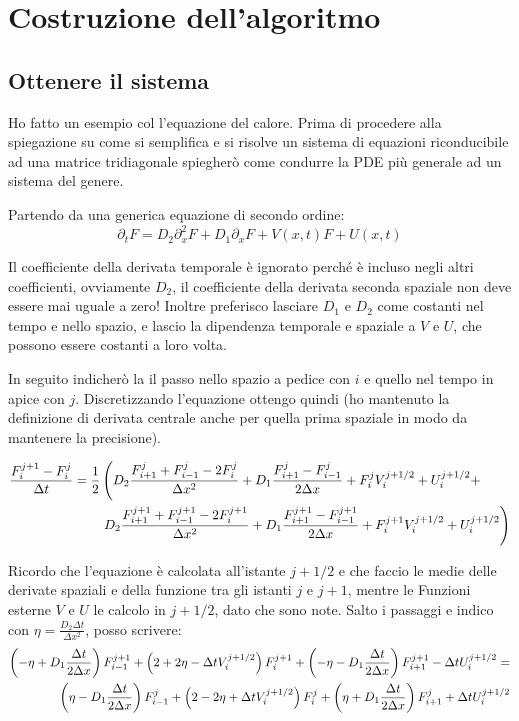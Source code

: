\section{Costruzione dell'algoritmo}
\subsection{Ottenere il sistema}
Ho fatto un esempio col l'equazione del calore. Prima di procedere alla spiegazione su come si semplifica e si risolve un sistema di equazioni riconducibile ad una matrice tridiagonale spiegher\`o come condurre la PDE pi\`u generale ad un sistema del genere.

Partendo da una generica equazione di secondo ordine:
\begin{equation}\label{eq:generica}
\partial_t F = D_2 \partial^2_x F + D_1 \partial_x F + V(x,t) F + U(x,t)
\end{equation}

Il coefficiente della derivata temporale \`e ignorato perch\'e \`e incluso negli altri coefficienti, ovviamente $D_2$, il coefficiente della derivata seconda spaziale non deve essere mai uguale a zero!
Inoltre preferisco lasciare $D_1$ e $D_2$ come costanti nel tempo e nello spazio, e lascio la dipendenza temporale e spaziale a $V$ e $U$, che possono essere costanti a loro volta.

In seguito indicher\`o la il passo nello spazio a pedice con $i$ e quello nel tempo in apice con $j$.
Discretizzando l'equazione ottengo quindi (ho mantenuto la definizione di derivata centrale anche per quella prima spaziale in modo da mantenere la precisione).

\begin{equation}
\begin{aligned}
\frac{F_i^{j+1} - F_i^j}{\Delta t} = \frac 12&\lr(.{D_2\frac{F^j_{i+1}+F^{j}_{i-1}-2F_i^{j}}{\Delta x^2} + D_1\frac{F^j_{i+1}-F^{j}_{i-1}}{2\Delta x} + F_i^j V_i^{j+1/2} + U_i^{j+1/2}+}\\
&\lr.){D_2\frac{F^{j+1}_{i+1}+F^{j+1}_{i-1}-2F_i^{j+1}}{\Delta x^2} + D_1\frac{F^{j+1}_{i+1}-F^{j+1}_{i-1}}{2\Delta x} + F_i^{j+1} V_i^{j+1/2} + U_i^{j+1/2}}
\end{aligned}
\end{equation}

Ricordo che l'equazione \`e calcolata all'istante $j+1/2$ e che faccio le medie delle derivate spaziali e della funzione tra gli istanti $j$  e $j+1$, mentre le Funzioni esterne $V$ e $U$ le calcolo in $j+1/2$, dato che sono note.
Salto i passaggi e indico con $\eta = \frac {D_2 \Delta t}{\Delta x^2}$, posso scrivere:
\begin{equation}
\begin{aligned}
\lrt{-\eta+D_1\frac{\Delta t}{2\Delta x}}F_{i-1}^{j+1} + \lrt{2 + 2\eta- \Delta t V_i^{j+1/2}} F^{j+1}_i + \lrt{-\eta-D_1\frac{\Delta t}{2\Delta x}}F_{i+1}^{j+1} - \Delta t U_i^{j+1/2} = \\
\lrt{\eta-D_1\frac{\Delta t}{2\Delta x}}F_{i-1}^{j} + \lrt{2-2\eta+\Delta t V_i^{j+1/2}} F^{j}_i + \lrt{\eta +D_1\frac{\Delta t}{2\Delta x}}F_{i+1}^{j} + \Delta t U_i^{j+1/2}
\end{aligned}
\end{equation}

